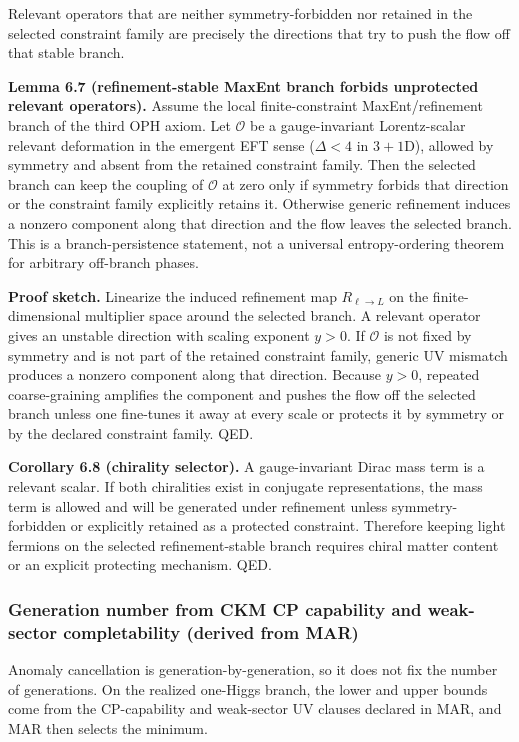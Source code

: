 Relevant operators that are neither symmetry-forbidden nor retained in the selected constraint family are precisely the directions that try to push the flow off that stable branch.

\textbf{Lemma 6.7 (refinement-stable MaxEnt branch forbids unprotected relevant operators).} Assume the local finite-constraint MaxEnt/refinement branch of the third OPH axiom. Let \(\mathcal{O}\) be a gauge-invariant Lorentz-scalar relevant deformation in the emergent EFT sense (\(\Delta<4\) in \(3+1\)D), allowed by symmetry and absent from the retained constraint family. Then the selected branch can keep the coupling of \(\mathcal{O}\) at zero only if symmetry forbids that direction or the constraint family explicitly retains it. Otherwise generic refinement induces a nonzero component along that direction and the flow leaves the selected branch. This is a branch-persistence statement, not a universal entropy-ordering theorem for arbitrary off-branch phases.

\textbf{Proof sketch.} Linearize the induced refinement map \(R_{\ell\to L}\) on the finite-dimensional multiplier space around the selected branch. A relevant operator gives an unstable direction with scaling exponent \(y>0\). If \(\mathcal{O}\) is not fixed by symmetry and is not part of the retained constraint family, generic UV mismatch produces a nonzero component along that direction. Because \(y>0\), repeated coarse-graining amplifies the component and pushes the flow off the selected branch unless one fine-tunes it away at every scale or protects it by symmetry or by the declared constraint family. QED.

\textbf{Corollary 6.8 (chirality selector).} A gauge-invariant Dirac mass term is a relevant scalar. If both chiralities exist in conjugate representations, the mass term is allowed and will be generated under refinement unless symmetry-forbidden or explicitly retained as a protected constraint. Therefore keeping light fermions on the selected refinement-stable branch requires chiral matter content or an explicit protecting mechanism. QED.

\subsubsection{Generation number from CKM CP capability and weak-sector completability (derived from MAR)}\label{64-generation-number-from-cp-violation-and-refinement-stability-derived-from-mar}

Anomaly cancellation is generation-by-generation, so it does not fix the number of generations. On the realized one-Higgs branch, the lower and upper bounds come from the CP-capability and weak-sector UV clauses declared in MAR, and MAR then selects the minimum.

